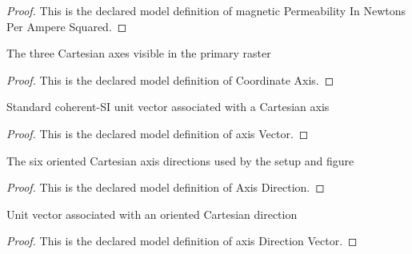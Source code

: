 \begin{proof}
  This is the declared model definition of magnetic Permeability In Newtons Per Ampere Squared.
\end{proof}
\begin{definition}
  \label{def:physics:phyx-mini-0962:phyxminiproblems-problemphyxmini0962-coordinateaxis}
  The three Cartesian axes visible in the primary raster
\end{definition}
\begin{proof}
  This is the declared model definition of Coordinate Axis.
\end{proof}
\begin{definition}
  \label{def:physics:phyx-mini-0962:phyxminiproblems-problemphyxmini0962-axisvector}
  Standard coherent-SI unit vector associated with a Cartesian axis
\end{definition}
\begin{proof}
  This is the declared model definition of axis Vector.
\end{proof}
\begin{definition}
  \label{def:physics:phyx-mini-0962:phyxminiproblems-problemphyxmini0962-axisdirection}
  The six oriented Cartesian axis directions used by the setup and figure
\end{definition}
\begin{proof}
  This is the declared model definition of Axis Direction.
\end{proof}
\begin{definition}
  \label{def:physics:phyx-mini-0962:phyxminiproblems-problemphyxmini0962-axisdirectionvector}
  Unit vector associated with an oriented Cartesian direction
\end{definition}
\begin{proof}
  This is the declared model definition of axis Direction Vector.
\end{proof}
